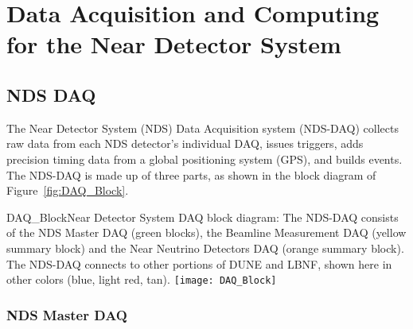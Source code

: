 \chapter{Data Acquisition and Computing for the Near Detector System} %
\label{ch:nd-gdaq}

\section{NDS DAQ}
\label{sec:nd-gdaq-intro}

The Near Detector System (NDS) Data Acquisition system (NDS-DAQ) collects raw data from each NDS detector's
individual DAQ, %
issues %
triggers, adds precision timing 
data from a global positioning system (GPS), and builds events. %
The NDS-DAQ is made up of three parts, as shown in the block diagram of 
Figure~\ref{fig:DAQ_Block}.

\begin{cdrfigure}{DAQ_Block}{Near Detector System DAQ block diagram: The NDS-DAQ consists 
of the NDS Master DAQ (green blocks), the Beamline Measurement DAQ (yellow summary 
block) and the Near Neutrino Detectors DAQ (orange summary block).  The 
NDS-DAQ connects to other portions of DUNE and LBNF, shown here in other colors (blue, 
light red, tan).}
\texttt{[image: DAQ\_Block]}
\end{cdrfigure}


\subsection{NDS Master DAQ} %
\label{sec:nd-master-daq}


